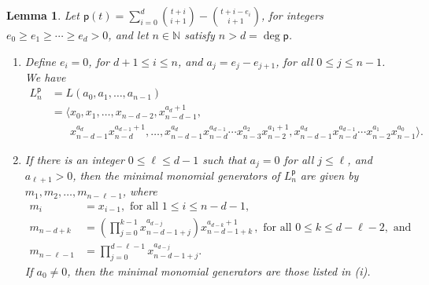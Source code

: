 \documentclass[12pt]{amsart}%
\newtheorem{lemma}[theorem]{Lemma}
\theoremstyle{definition}%
\newcommand{\hp}{\mathsf{p}}%
\newcommand{\NN}{\mathbb{N}}%
\newcommand{\relphantom}[1]{\mathrel{\phantom{ #1 }}}
\begin{document}
\begin{lemma}
  \label{lem:lexmingens}
  Let $\hp(t) = \sum_{i=0}^{d} \binom{t + i}{i + 1} - \binom{t + i -
    e_i}{i + 1}$, for integers $e_0 \ge e_1 \ge \dotsb \ge e_d > 0$,
  and let $n \in \NN$ satisfy $n > d = \deg \hp$.
  \begin{enumerate}
  \item Define $e_i = 0$, for $d+1 \le i \le n$, and $a_{j} = e_{j} -
    e_{j+1}$, for all $0 \le j \le n-1$.  We have
    \begin{align*}
      L^{\hp}_n &= L(a_0, a_1, \dotsc, a_{n-1}) \\
                &= \langle x_0, x_1, \dotsc , x_{n-d-2},
                  x_{n-d-1}^{a_{d} + 1}, \\
                &\relphantom{= \langle} x_{n-d-1}^{a_{d}}
                  x_{n-d}^{a_{d-1} + 1}, \dotsc ,
                  x_{n-d-1}^{a_{d}} x_{n-d}^{a_{d-1}} \dotsb
                  x_{n-3}^{a_{2}} x_{n-2}^{a_{1} + 1}, 
                  x_{n-d-1}^{a_{d}}
                  x_{n-d}^{a_{d-1}} \dotsb x_{n-2}^{a_{1}}
                  x_{n-1}^{a_{0}} \rangle .
    \end{align*}

  \item If there is an integer $0 \le \ell \le d-1$ such that $a_j =
    0$ for all $j \le \ell$, and $a_{\ell + 1} > 0$, then the minimal
    monomial generators of $L^{\hp}_n$ are given by $m_1, m_2, \dotsc,
    m_{n - \ell - 1}$, where
    \begin{align*}
      m_i &= x_{i-1}, \text{ for all } 1 \le i \le n-d-1, \\
      m_{n-d + k} &= \left( \prod_{j=0}^{k-1} x_{n-d-1 + j}^{a_{d -
          j}} \right) x_{n-d-1 + k}^{a_{d-k} + 1}\,, \text{ for all } 0 \le k \le d -
        \ell -2, \text{ and } \\
      m_{n-\ell-1} &= \prod_{j=0}^{d-\ell-1} x_{n-d-1 + j}^{a_{d - j}}.
    \end{align*}
    If $a_0 \ne 0$, then the minimal monomial generators are those
    listed in (i).
  \end{enumerate}
\end{lemma}
\end{document}
